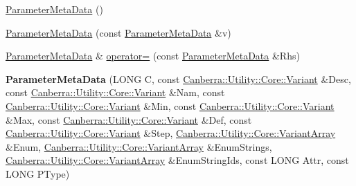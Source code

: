 \begin{DoxyCompactItemize}
\item 
\hyperlink{class_canberra_1_1_data_types_1_1_application_1_1_parameter_meta_data_a164df16301f3fc5bd14ca63476d7ed63_a164df16301f3fc5bd14ca63476d7ed63}{Parameter\+Meta\+Data} ()
\item 
\hyperlink{class_canberra_1_1_data_types_1_1_application_1_1_parameter_meta_data_a98989e4fb78026ad5689e23a8802f9ea_a98989e4fb78026ad5689e23a8802f9ea}{Parameter\+Meta\+Data} (const \hyperlink{class_canberra_1_1_data_types_1_1_application_1_1_parameter_meta_data}{Parameter\+Meta\+Data} \&v)
\item 
\hyperlink{class_canberra_1_1_data_types_1_1_application_1_1_parameter_meta_data}{Parameter\+Meta\+Data} \& \hyperlink{class_canberra_1_1_data_types_1_1_application_1_1_parameter_meta_data_acbff26f03ebee9ac4d8d5f199ca2605f_acbff26f03ebee9ac4d8d5f199ca2605f}{operator=} (const \hyperlink{class_canberra_1_1_data_types_1_1_application_1_1_parameter_meta_data}{Parameter\+Meta\+Data} \&Rhs)
\item 
\mbox{\label{class_canberra_1_1_data_types_1_1_application_1_1_parameter_meta_data_aa5e9a86b9cb7bc4ec9144193dca1eb0c}} 
{\bfseries Parameter\+Meta\+Data} (L\+O\+NG C, const \hyperlink{class_canberra_1_1_utility_1_1_core_1_1_variant}{Canberra\+::\+Utility\+::\+Core\+::\+Variant} \&Desc, const \hyperlink{class_canberra_1_1_utility_1_1_core_1_1_variant}{Canberra\+::\+Utility\+::\+Core\+::\+Variant} \&Nam, const \hyperlink{class_canberra_1_1_utility_1_1_core_1_1_variant}{Canberra\+::\+Utility\+::\+Core\+::\+Variant} \&Min, const \hyperlink{class_canberra_1_1_utility_1_1_core_1_1_variant}{Canberra\+::\+Utility\+::\+Core\+::\+Variant} \&Max, const \hyperlink{class_canberra_1_1_utility_1_1_core_1_1_variant}{Canberra\+::\+Utility\+::\+Core\+::\+Variant} \&Def, const \hyperlink{class_canberra_1_1_utility_1_1_core_1_1_variant}{Canberra\+::\+Utility\+::\+Core\+::\+Variant} \&Step, \hyperlink{class_canberra_1_1_utility_1_1_core_1_1_variant_array}{Canberra\+::\+Utility\+::\+Core\+::\+Variant\+Array} \&Enum, \hyperlink{class_canberra_1_1_utility_1_1_core_1_1_variant_array}{Canberra\+::\+Utility\+::\+Core\+::\+Variant\+Array} \&Enum\+Strings, \hyperlink{class_canberra_1_1_utility_1_1_core_1_1_variant_array}{Canberra\+::\+Utility\+::\+Core\+::\+Variant\+Array} \&Enum\+String\+Ids, const L\+O\+NG Attr, const L\+O\+NG P\+Type)
\item 

\end{DoxyCompactItemize}

